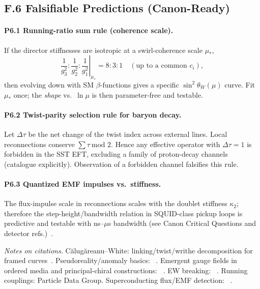 \documentclass[11pt]{article}
\begin{document}
\subsection*{F.6 Falsifiable Predictions (Canon-Ready)}

\paragraph{P6.1 Running-ratio sum rule (coherence scale).}
If the director stiffnesses are isotropic at a swirl-coherence scale $\mu_\ast$,
\[
    \left.
    \frac{1}{g_3^2}:\frac{1}{g_2^2}:\frac{1}{g_1^2}
    \right|_{\mu_\ast}
    = 8:3:1\quad (\text{up to a common }c_i),
\]
then evolving down with SM $\beta$-functions gives a specific $\sin^2\theta_W(\mu)$ curve. Fit $\mu_\ast$ once; the \emph{shape} vs.\ $\ln\mu$ is then parameter-free and testable\cite{PDG2024}.

\paragraph{P6.2 Twist-parity selection rule for baryon decay.}
Let $\Delta\tau$ be the net change of the twist index across external lines. Local reconnections conserve $\sum \tau\ \text{mod }2$. Hence any effective operator with $\Delta\tau=1$ is forbidden in the SST EFT, excluding a family of proton-decay channels (catalogue explicitly). Observation of a forbidden channel falsifies this rule.

\paragraph{P6.3 Quantized EMF impulses vs.\ stiffness.}
The flux-impulse scale in reconnections scales with the doublet stiffness $\kappa_2$; therefore the step-height/bandwidth relation in SQUID-class pickup loops is predictive and testable with ns--$\mu$s bandwidth (see Canon Critical Questions and detector refs.)~\cite{Tinkham1996,ClarkeBraginski2004}.

\bigskip
\noindent\textit{Notes on citations.}
Călugăreanu--White: linking/twist/writhe decomposition for framed curves~\cite{Calugareanu1961,White1969}.
Pseudoreality/anomaly basics: ~\cite{Witten1982,WeinbergQFT2,PeskinSchroeder}.
Emergent gauge fields in ordered media and principal-chiral constructions: ~\cite{Volovik2003,Fradkin2013,Cho1980,FaddeevNiemi1999,Zee2010,Wen2004}.
EW breaking: ~\cite{Weinberg1967,EnglertBrout1964,Higgs1964}.
Running couplings: Particle Data Group\cite{PDG2024}.
Superconducting flux/EMF detection: ~\cite{Tinkham1996,ClarkeBraginski2004}.
\end{document}

